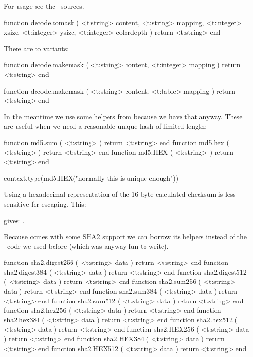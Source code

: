 For usage see the \CONTEXT\ sources.

\starttyping[option=LUA]
function decode.tomask (
    <t:string>  content,
    <t:string>  mapping,
    <t:integer> xsize,
    <t:integer> ysize,
    <t:integer> colordepth
)
    return <t:string>
end
\stoptyping

There are to variants:

\starttyping[option=LUA]
function decode.makemask (
    <t:string>  content,
    <t:integer> mapping
)
    return <t:string>
end

function decode.makemask (
    <t:string> content,
    <t:table>  mapping
)
    return <t:string>
end
\stoptyping

\stopsubsection

\startsubsection[title=MD5 hashing]

In the meantime we use some helpers from  because we have that
anyway. These are useful when we need a reasonable unique hash of limited length:

\starttyping[option=LUA]
function md5.sum ( <t:string> ) return <t:string> end
function md5.hex ( <t:string> ) return <t:string> end
function md5.HEX ( <t:string> ) return <t:string> end
\stoptyping

\startbuffer
\startluacode
context.type(md5.HEX("normally this is unique enough"))
\stopluacode
\stopbuffer

Using a hexadecimal representation of the 16 byte calculated checksum is less
sensitive for escaping. This:

\typebuffer

gives: \inlinebuffer.

\stopsubsection

\startsubsection[title=SHA2 hashing]

Because  comes with some SHA2 support we can borrow its helpers
instead of the \LUA\ code we used before (which was anyway fun to write).

\starttyping[option=LUA]
function sha2.digest256 ( <t:string> data ) return <t:string> end
function sha2.digest384 ( <t:string> data ) return <t:string> end
function sha2.digest512 ( <t:string> data ) return <t:string> end
function sha2.sum256    ( <t:string> data ) return <t:string> end
function sha2.sum384    ( <t:string> data ) return <t:string> end
function sha2.sum512    ( <t:string> data ) return <t:string> end
function sha2.hex256    ( <t:string> data ) return <t:string> end
function sha2.hex384    ( <t:string> data ) return <t:string> end
function sha2.hex512    ( <t:string> data ) return <t:string> end
function sha2.HEX256    ( <t:string> data ) return <t:string> end
function sha2.HEX384    ( <t:string> data ) return <t:string> end
function sha2.HEX512    ( <t:string> data ) return <t:string> end
\stoptyping


